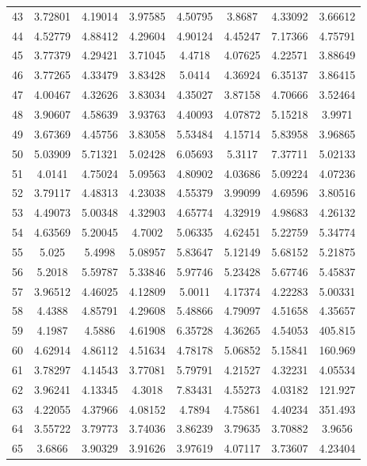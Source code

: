 \begin{center}
\begin{longtable}{cccccccc}
43 & 3.72801 & 4.19014 & 3.97585 & 4.50795 & 3.8687 & 4.33092 & 3.66612\\
44 & 4.52779 & 4.88412 & 4.29604 & 4.90124 & 4.45247 & 7.17366 & 4.75791\\
45 & 3.77379 & 4.29421 & 3.71045 & 4.4718 & 4.07625 & 4.22571 & 3.88649\\
46 & 3.77265 & 4.33479 & 3.83428 & 5.0414 & 4.36924 & 6.35137 & 3.86415\\
47 & 4.00467 & 4.32626 & 3.83034 & 4.35027 & 3.87158 & 4.70666 & 3.52464\\
48 & 3.90607 & 4.58639 & 3.93763 & 4.40093 & 4.07872 & 5.15218 & 3.9971\\
49 & 3.67369 & 4.45756 & 3.83058 & 5.53484 & 4.15714 & 5.83958 & 3.96865\\
50 & 5.03909 & 5.71321 & 5.02428 & 6.05693 & 5.3117 & 7.37711 & 5.02133\\
51 & 4.0141 & 4.75024 & 5.09563 & 4.80902 & 4.03686 & 5.09224 & 4.07236\\
52 & 3.79117 & 4.48313 & 4.23038 & 4.55379 & 3.99099 & 4.69596 & 3.80516\\
53 & 4.49073 & 5.00348 & 4.32903 & 4.65774 & 4.32919 & 4.98683 & 4.26132\\
54 & 4.63569 & 5.20045 & 4.7002 & 5.06335 & 4.62451 & 5.22759 & 5.34774\\
55 & 5.025 & 5.4998 & 5.08957 & 5.83647 & 5.12149 & 5.68152 & 5.21875\\
56 & 5.2018 & 5.59787 & 5.33846 & 5.97746 & 5.23428 & 5.67746 & 5.45837\\
57 & 3.96512 & 4.46025 & 4.12809 & 5.0011 & 4.17374 & 4.22283 & 5.00331\\
58 & 4.4388 & 4.85791 & 4.29608 & 5.48866 & 4.79097 & 4.51658 & 4.35657\\
59 & 4.1987 & 4.5886 & 4.61908 & 6.35728 & 4.36265 & 4.54053 & 405.815\\
60 & 4.62914 & 4.86112 & 4.51634 & 4.78178 & 5.06852 & 5.15841 & 160.969\\
61 & 3.78297 & 4.14543 & 3.77081 & 5.79791 & 4.21527 & 4.32231 & 4.05534\\
62 & 3.96241 & 4.13345 & 4.3018 & 7.83431 & 4.55273 & 4.03182 & 121.927\\
63 & 4.22055 & 4.37966 & 4.08152 & 4.7894 & 4.75861 & 4.40234 & 351.493\\
64 & 3.55722 & 3.79773 & 3.74036 & 3.86239 & 3.79635 & 3.70882 & 3.9656\\
65 & 3.6866 & 3.90329 & 3.91626 & 3.97619 & 4.07117 & 3.73607 & 4.23404\\

\end{longtable}
\end{center}
